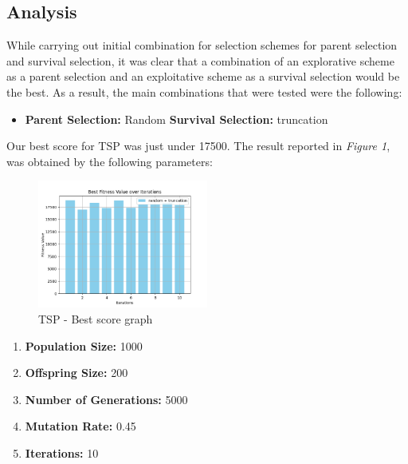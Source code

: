 \documentclass[12pt]{article}
\begin{document}
\subsection{Analysis}

While carrying out initial combination for selection schemes for parent selection and survival selection, it was clear that a combination of an explorative scheme as a parent selection and an exploitative scheme as a survival selection would be the best. As a result, the main combinations that were tested were the following:

    \begin{itemize}
        \item \textbf{Parent Selection:} Random \textbf{Survival Selection:} truncation
    \end{itemize}

Our best score for TSP was just under 17500. The result reported in \textit{Figure 1}, was obtained by the following parameters:


\begin{figure}[h]
    \centering
    \includegraphics[width=0.5\textwidth]{images/figure_1.png}
    \caption{TSP - Best score graph}
\end{figure}


\begin{enumerate}
    \item \textbf{Population Size:} 1000
    \item \textbf{Offspring Size:} 200
    \item \textbf{Number of Generations:} 5000
    \item \textbf{Mutation Rate:} 0.45
    \item \textbf{Iterations:} 10
\end{enumerate}
\end{document}
